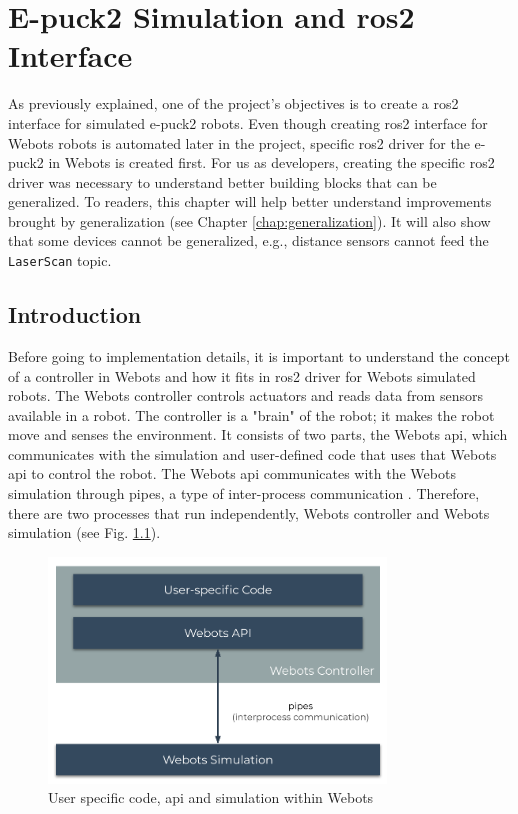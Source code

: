 \chapter{E-puck2 Simulation and \acs{ros2} Interface}
\label{chap:simulation}

As previously explained, one of the project's objectives is to create a \ac{ros2} interface for simulated e-puck2 robots.
Even though creating \ac{ros2} interface for Webots robots is automated later in the project, specific \ac{ros2} driver for the e-puck2 in Webots is created first.
For us as developers, creating the specific \ac{ros2} driver was necessary to understand better building blocks that can be generalized.
To readers, this chapter will help better understand improvements brought by generalization (see Chapter \ref{chap:generalization}).
It will also show that some devices cannot be generalized, e.g., distance sensors cannot feed the \texttt{LaserScan} topic.

\section{Introduction}

Before going to implementation details, it is important to understand the concept of a controller in Webots and how it fits in \ac{ros2} driver for Webots simulated robots.
The Webots controller controls actuators and reads data from sensors available in a robot.
The controller is a "brain" of the robot; it makes the robot move and senses the environment.
It consists of two parts, the Webots \ac{api}, which communicates with the simulation and user-defined code that uses that Webots \ac{api} to control the robot.
The Webots \ac{api} communicates with the Webots simulation through pipes, a type of inter-process communication \cite{kashyian_portable_2008}.
Therefore, there are two processes that run independently, Webots controller and Webots simulation (see Fig. \ref{fig:simulation:webots_user_code_and_api}).

\begin{figure}[H]
    \centering
    \includegraphics[width=0.8\textwidth]{simulation/figures/webots_user_code_and_api.pdf}
    \caption{User specific code, \ac{api} and simulation within Webots}
    \label{fig:simulation:webots_user_code_and_api}
\end{figure}

